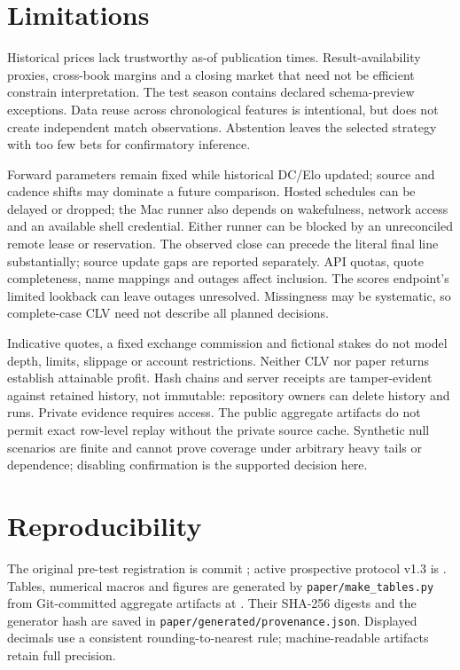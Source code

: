 \documentclass[11pt]{article}
\begin{document}
\section{Limitations}
Historical prices lack trustworthy as-of publication times. Result-availability proxies,
cross-book margins and a closing market that need not be efficient constrain interpretation.
The test season contains declared schema-preview exceptions. Data reuse across chronological
features is intentional, but does not create independent match observations. Abstention
leaves the selected strategy with too few bets for confirmatory inference.

Forward parameters remain fixed while historical DC/Elo updated; source and cadence shifts
may dominate a future comparison. Hosted schedules can be delayed or dropped; the Mac runner also depends on wakefulness,
network access and an available shell credential. Either runner can be blocked by an
unreconciled remote lease or reservation. The observed
close can precede the literal final line substantially; source update gaps are reported
separately. API quotas, quote completeness, name mappings and outages affect inclusion.
The scores endpoint's limited lookback can leave outages unresolved. Missingness may be
systematic, so complete-case CLV need not describe all planned decisions.

Indicative quotes, a fixed exchange commission and fictional stakes do not model depth,
limits, slippage or account restrictions. Neither CLV nor paper returns establish attainable
profit. Hash chains and server receipts are tamper-evident against retained history, not
immutable: repository owners can delete history and runs. Private evidence requires access.
The public aggregate artifacts do not permit exact row-level replay without the private
source cache. Synthetic null scenarios are finite and cannot prove coverage under arbitrary
heavy tails or dependence; disabling confirmation is the supported decision here.

\section{Reproducibility}
The original pre-test registration is commit
\texttt{\originalCommit}; active prospective protocol v1.3 is
\texttt{\registrationCommit}. Tables, numerical macros and figures are generated by
\texttt{paper/make\_tables.py} from Git-committed aggregate artifacts at
\texttt{\sourceCommit}. Their SHA-256 digests and the generator hash are saved in
\texttt{paper/generated/provenance.json}. Displayed decimals use a consistent rounding-to-nearest
rule; machine-readable artifacts retain full precision.
\end{document}

